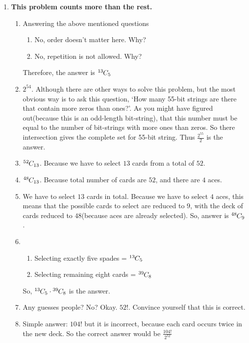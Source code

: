 \documentclass[11pt]{article}
\newcommand*{\permcomb}[4][0mu]{{{}^{#3}\mkern#1#2_{#4}}}
\newcommand*{\comb}[1][-1mu]{\permcomb[#1]{C}}
\begin{document}
	\begin{enumerate}
		
		\item \textbf{This problem counts more than the rest.}
			
			\begin{enumerate}
				\item Answering the above mentioned questions
					\begin{enumerate}
						\item No, order doesn't matter here. Why? 
						\item No, repetition is not allowed. Why?
					\end{enumerate}  
				Therefore, the answer is $\comb{13}{5}$ \\
				\item $2^{54}$. Although there are other ways to solve this problem, but the most obvious way is to ask this question, `How many 55-bit strings are there that contain more zeros than ones?'. As you might have figured out(because this is an odd-length bit-string), that this number must be equal to the number of bit-strings with more ones than zeros. So there intersection gives the complete set for 55-bit string. Thus $\frac{2^{55}}{2}$ is the answer. 
				\item $\comb{52}{13}$. Because we have to select $13$ cards from a total of $52$. 
				\item $\comb{48}{13}$. Because total number of cards are $52$, and there are $4$ aces.
				\item We have to select $13$ cards in total. Because we have to select $4$ aces, this means that the possible cards to select are reduced to $9$, with the deck of cards reduced to $48$(because aces are already selected). So, answer is $\comb{48}{9}$.
				\item 
					\begin{enumerate}
						\item Selecting exactly five spades = $\comb{13}{5}$
						\item Selecting remaining eight cards = $\comb{39}{8}$
					\end{enumerate}
				So, $\comb{13}{5} \cdot \comb{39}{8}$ is the answer. 
				\item Any guesses people? No? Okay. $52!$. Convince yourself that this is correct. 
				\item Simple answer: $104!$ but it is incorrect, because each card occurs twice in the new deck. So the correct answer would be $\frac{104!}{2^{52}}$

\end{enumerate}
\end{enumerate}
\end{document}
